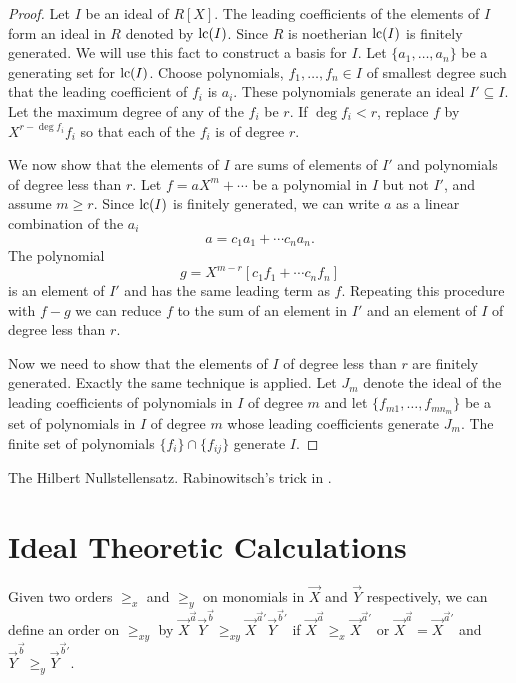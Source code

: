 \begin{proof}
Let $I$ be an ideal of $R[X]$.  The leading coefficients of the
elements of $I$ form an ideal in $R$ denoted by $\operatorname{lc}(I)$.  Since $R$
is noetherian $\operatorname{lc}(I)$ is finitely generated.  We will use this fact
to construct a basis for $I$.  Let $\{a_1, \ldots, a_n\}$ be a
generating set for $\operatorname{lc}(I)$.  Choose polynomials, $f_1, \ldots, f_n
\in I$ of smallest degree such that the leading coefficient of $f_i$
is $a_i$.  These polynomials generate an ideal $I' \subseteq I$.  Let
the maximum degree of any of the $f_i$ be $r$.  If $\deg f_i < r$,
replace $f$ by $X^{r -\deg f_i} f_i$ so that each of the $f_i$ is of
degree $r$.

We now show that the elements of $I$ are sums of elements of $I'$ and
polynomials of degree less than $r$.  Let $f = a X^m + \cdots$ be a
polynomial in $I$ but not $I'$, and assume $m \ge r$.  Since $\operatorname{lc}(I)$
is finitely generated, we can write $a$ as a linear combination of the
$a_i$
\[
a = c_1 a_1 + \cdots c_n a_n.
\]
The polynomial 
\[
g = X^{m-r} \left[ c_1 f_1 + \cdots c_n f_n \right]
\]
is an element of $I'$ and has the same leading term as $f$.  Repeating
this procedure with $f - g$ we can reduce $f$ to the sum of an element
in $I'$ and an element of $I$ of degree less than $r$.

Now we need to show that the elements of $I$ of degree less than $r$
are finitely generated.  Exactly the same technique is applied.  Let
$J_m$ denote the ideal of the leading coefficients of polynomials in
$I$ of degree $m$ and let $\{ f_{m1}, \ldots, f_{m n_m} \}$ be a set
of polynomials in $I$ of degree $m$ whose leading coefficients
generate $J_m$.  The finite set of polynomials $\{f_i \} \cap \{f_{ij}
\}$ generate $I$.

\end{proof}

The Hilbert Nullstellensatz.  Rabinowitsch's trick in \cite{Rabinowitsch1930-ww}.

\section{Ideal Theoretic Calculations}
\label{Ideal:Arith:Sec}

Given two orders $\ge_{x}$ and $\ge_{y}$ on monomials in $\vec X$ and
$\vec Y$ respectively, we can define an order on $\ge_{xy}$ by $\vec
X^{\vec a} \vec Y^{\vec b} \ge_{xy} \vec X^{\vec a'} \vec Y^{\vec b'}$
if $\vec X^{\vec a} \ge_{x} \vec X^{\vec a'}$ or $\vec X^{\vec a} =
\vec X^{\vec a'}$ and $\vec Y^{\vec b} \ge_{y} \vec Y^{\vec b'}$.

